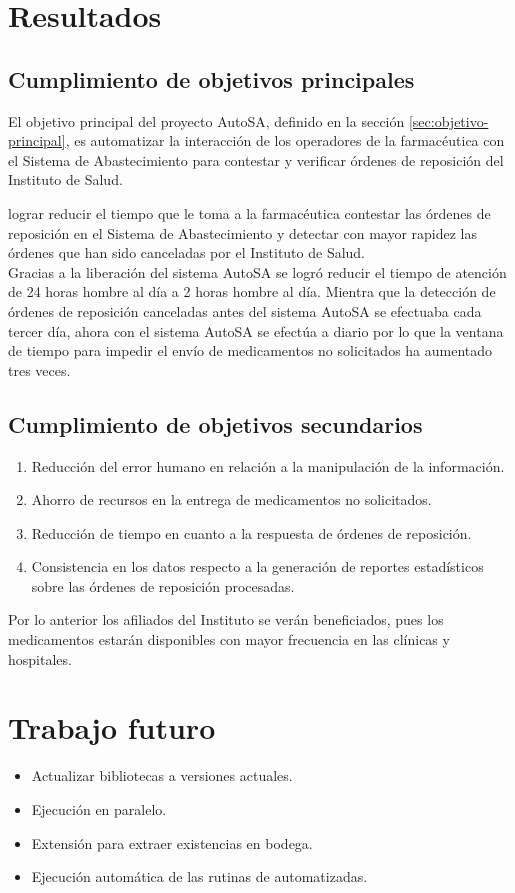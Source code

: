 \section{Resultados}

\subsection{Cumplimiento de objetivos principales}
El objetivo principal del proyecto AutoSA, definido en la sección \ref{sec:objetivo-principal}, es automatizar la interacción de los operadores de la farmacéutica con el Sistema de Abastecimiento para contestar y verificar órdenes de reposición del Instituto de Salud.


 lograr reducir el tiempo que le toma a la farmacéutica contestar las órdenes de reposición en el Sistema de Abastecimiento y detectar con mayor rapidez las órdenes que han sido canceladas por el Instituto de Salud.\\
Gracias a la liberación del sistema AutoSA se logró reducir el tiempo de atención de 24 horas hombre al día a 2 horas hombre al día. Mientra que la detección de órdenes de reposición canceladas antes del sistema AutoSA se efectuaba cada tercer día, ahora con el sistema AutoSA se efectúa a diario por lo que la ventana de tiempo para impedir el envío de medicamentos no solicitados ha aumentado tres veces.

\subsection{Cumplimiento de objetivos secundarios}

\begin{enumerate}
	\item Reducción del error humano en relación a la manipulación de la información.
	\item Ahorro de recursos en la entrega de medicamentos no solicitados.
	\item Reducción de tiempo en cuanto a la respuesta de órdenes de reposición.
	\item Consistencia en los datos respecto a la generación de reportes estadísticos sobre las órdenes de reposición procesadas.
\end{enumerate}
Por lo anterior los afiliados del Instituto se verán beneficiados, pues los medicamentos estarán disponibles con mayor frecuencia en las clínicas y hospitales.



\section{Trabajo futuro}
\begin{itemize}
	\item Actualizar bibliotecas a versiones actuales.
	\item Ejecución en paralelo.
	\item Extensión para extraer existencias en bodega.
	\item Ejecución automática de las rutinas de automatizadas.
\end{itemize}

